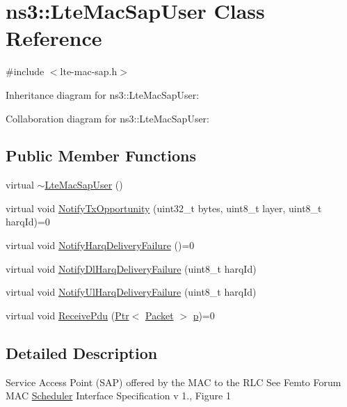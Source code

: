 \hypertarget{classns3_1_1LteMacSapUser}{}\section{ns3\+:\+:Lte\+Mac\+Sap\+User Class Reference}
\label{classns3_1_1LteMacSapUser}


{\ttfamily \#include $<$lte-\/mac-\/sap.\+h$>$}



Inheritance diagram for ns3\+:\+:Lte\+Mac\+Sap\+User\+:


Collaboration diagram for ns3\+:\+:Lte\+Mac\+Sap\+User\+:
\subsection*{Public Member Functions}
\begin{DoxyCompactItemize}
\item 
virtual \hyperlink{classns3_1_1LteMacSapUser_aa768d17fa78b1393af5c7545fbd936bf}{$\sim$\+Lte\+Mac\+Sap\+User} ()
\item 
virtual void \hyperlink{classns3_1_1LteMacSapUser_a02bcc3f8d396751cae20d4b0da65ed68}{Notify\+Tx\+Opportunity} (uint32\+\_\+t bytes, uint8\+\_\+t layer, uint8\+\_\+t harq\+Id)=0
\item 
virtual void \hyperlink{classns3_1_1LteMacSapUser_accc7fc82f7c9b46d2a1550971b71ce8a}{Notify\+Harq\+Delivery\+Failure} ()=0
\item 
virtual void \hyperlink{classns3_1_1LteMacSapUser_aec1b1c0eb2a7119757487c176af95423}{Notify\+Dl\+Harq\+Delivery\+Failure} (uint8\+\_\+t harq\+Id)
\item 
virtual void \hyperlink{classns3_1_1LteMacSapUser_ab9149fa375bd3d780f1c8b6ad6bb7254}{Notify\+Ul\+Harq\+Delivery\+Failure} (uint8\+\_\+t harq\+Id)
\item 
virtual void \hyperlink{classns3_1_1LteMacSapUser_a5e2dde528876b8b095e94f98f606121e}{Receive\+Pdu} (\hyperlink{classns3_1_1Ptr}{Ptr}$<$ \hyperlink{classns3_1_1Packet}{Packet} $>$ \hyperlink{lte__link__budget__x2__handover__measures_8m_ac9de518908a968428863f829398a4e62}{p})=0
\end{DoxyCompactItemize}


\subsection{Detailed Description}
Service Access Point (S\+AP) offered by the M\+AC to the R\+LC See Femto Forum M\+AC \hyperlink{classns3_1_1Scheduler}{Scheduler} Interface Specification v 1., Figure 1

